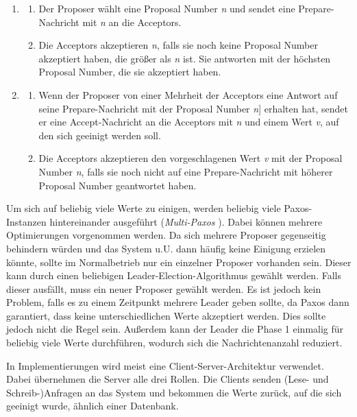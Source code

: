 \begin{enumerate}
	\item 
		\begin{enumerate}[label=\alph*)]
			\item Der Proposer wählt eine Proposal Number \textit{n} und sendet eine Prepare-Nachricht mit  \textit{n} an die Acceptors. 
			\item Die Acceptors akzeptieren \textit{n}, falls sie noch keine Proposal Number akzeptiert haben, die größer als \textit{n} ist. Sie antworten mit der höchsten Proposal Number, die sie akzeptiert haben.
		\end{enumerate}
	\item
		\begin{enumerate}[label=\alph*)]
		\item Wenn der Proposer von einer Mehrheit der Acceptors eine Antwort auf seine Prepare-Nachricht mit der Proposal Number \textit{n}] erhalten hat, sendet er eine Accept-Nachricht an die Acceptors mit \textit{n} und einem Wert \textit{v}, auf den sich geeinigt werden soll.
		\item Die Acceptors akzeptieren den vorgeschlagenen Wert \textit{v} mit der Proposal Number \textit{n}, falls sie noch nicht auf eine Prepare-Nachricht mit höherer Proposal Number geantwortet haben.
	\end{enumerate}
\end{enumerate}

Um sich auf beliebig viele Werte zu einigen, werden beliebig viele Paxos-Instanzen hintereinander ausgeführt (\textit{Multi-Paxos} \cite{paxos-made-live}). Dabei können mehrere Optimierungen vorgenommen werden. Da sich mehrere Proposer gegenseitig behindern würden und das System u.U. dann häufig keine Einigung erzielen könnte, sollte im Normalbetrieb nur ein einzelner Proposer vorhanden sein. Dieser kann durch einen beliebigen Leader-Election-Algorithmus gewählt werden. Falls dieser ausfällt, muss ein neuer Proposer gewählt werden. Es ist jedoch kein Problem, falls es zu einem Zeitpunkt mehrere Leader geben sollte, da Paxos dann garantiert, dass keine unterschiedlichen Werte akzeptiert werden. Dies sollte jedoch nicht die Regel sein. Außerdem kann der Leader die Phase 1 einmalig für beliebig viele Werte durchführen, wodurch sich die Nachrichtenanzahl reduziert.

In Implementierungen wird meist eine Client-Server-Architektur verwendet. Dabei übernehmen die Server alle drei Rollen. Die Clients senden (Lese- und Schreib-)Anfragen an das System und bekommen die Werte zurück, auf die sich geeinigt wurde, ähnlich einer Datenbank.


